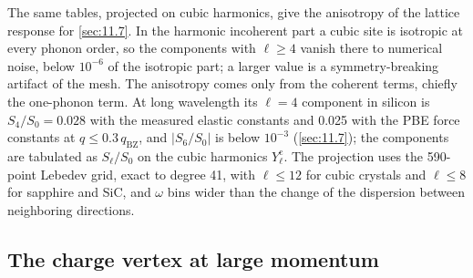 The same tables, projected on cubic harmonics, give the anisotropy of the lattice response for \cref{sec:11.7}. In the harmonic incoherent part a cubic site is isotropic at every phonon order, so the components with $\ell \ge 4$ vanish there to numerical noise, below $10^{-6}$ of the isotropic part; a larger value is a symmetry-breaking artifact of the mesh. The anisotropy comes only from the coherent terms, chiefly the one-phonon term. At long wavelength its $\ell = 4$ component in silicon is $S_4/S_0 = 0.028$ with the measured elastic constants and 0.025 with the PBE force constants at $q \le 0.3\,q_{\mathrm{BZ}}$, and $|S_6/S_0|$ is below $10^{-3}$ (\cref{sec:11.7}); the components are tabulated as $S_\ell/S_0$ on the cubic harmonics $Y^{\mathrm{c}}_\ell$. The projection uses the 590-point Lebedev grid, exact to degree 41, with $\ell \le 12$ for cubic crystals and $\ell \le 8$ for sapphire and SiC, and $\omega$ bins wider than the change of the dispersion between neighboring directions.

\subsection{The charge vertex at large momentum}

